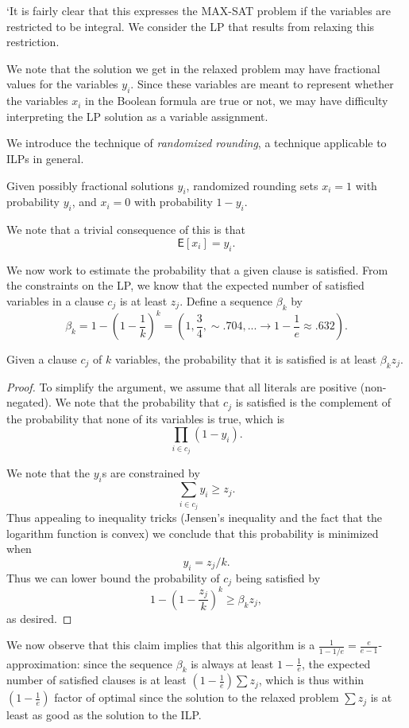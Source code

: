 \documentclass{article}
\newcommand{\E}{\mbox{$\mathsf E$}}
\begin{document}
`It is fairly clear that this expresses the MAX-SAT problem if the variables are restricted to be integral.  We consider the LP that results from relaxing this restriction.

We note that the solution we get in the relaxed problem may have fractional values for the variables $y_i$.  Since these variables are meant to represent whether the variables $x_i$ in the Boolean formula are true or not, we may have difficulty interpreting the LP solution as a variable assignment.

We introduce the technique of \emph{randomized rounding}, a technique applicable to ILPs in general.

Given possibly fractional solutions $y_i$, randomized rounding sets $x_i=1$ with probability $y_i$, and $x_i=0$ with probability $1-y_i$.

We note that a trivial consequence of this is that $$\E[x_i]=y_i.$$

We now work to estimate the probability that a given clause is satisfied.  From the constraints on the LP, we know that the expected number of satisfied variables in a clause $c_j$ is at least $z_j$.  Define a sequence $\beta_k$ by $$\beta_k=1-(1-\frac{1}{k})^k=(1,\frac{3}{4},\sim .704,...\rightarrow 1-\frac{1}{e}\approx .632).$$

\begin{claim}
Given a clause $c_j$ of $k$ variables, the probability that it is satisfied is at least $\beta_kz_j$.
\end{claim}

\begin{proof}
To simplify the argument, we assume that all literals are positive (non-negated).  We note that the probability that $c_j$ is satisfied is the complement of the probability that none of its variables is true, which is $$\prod_{i\in c_j}(1-y_i).$$

We note that the $y_i$s are constrained by $$\sum_{i\in c_j} y_i\geq z_j.$$  Thus appealing to inequality tricks (Jensen's inequality and the fact that the logarithm function is convex) we conclude that this probability is minimized when $$y_i=z_j/k.$$
Thus we can lower bound the probability of $c_j$ being satisfied by $$1-(1-\frac{z_j}{k})^k\geq\beta_kz_j,$$ as desired.
\end{proof}

We now observe that this claim implies that this algorithm is a $\frac{1}{1-1/e}=\frac{e}{e-1}$-approximation: since the sequence $\beta_k$ is always at least $1-\frac{1}{e}$, the expected number of satisfied clauses is at least $(1-\frac{1}{e})\sum z_j$, which is thus within $(1-\frac{1}{e})$ factor of optimal since the solution to the relaxed problem $\sum z_j$ is at least as good as the solution to the ILP.
\end{document}
